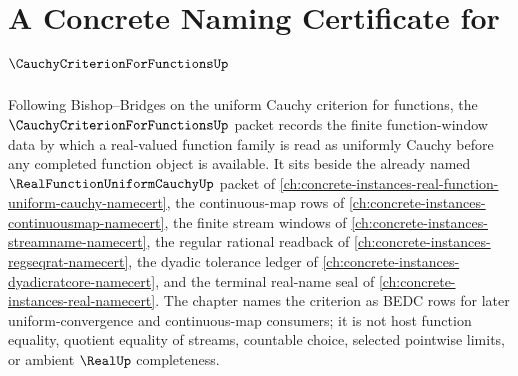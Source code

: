 \chapter{A Concrete Naming Certificate for $\CauchyCriterionForFunctionsUp$}
\label{ch:concrete-instances-cauchy-criterion-for-functions-namecert}

Following Bishop--Bridges on the uniform Cauchy criterion for functions, the $\CauchyCriterionForFunctionsUp$ packet records the finite function-window data by which a real-valued function family is read as uniformly Cauchy before any completed function object is available. It sits beside the already named $\RealFunctionUniformCauchyUp$ packet of \autoref{ch:concrete-instances-real-function-uniform-cauchy-namecert}, the continuous-map rows of \autoref{ch:concrete-instances-continuousmap-namecert}, the finite stream windows of \autoref{ch:concrete-instances-streamname-namecert}, the regular rational readback of \autoref{ch:concrete-instances-regseqrat-namecert}, the dyadic tolerance ledger of \autoref{ch:concrete-instances-dyadicratcore-namecert}, and the terminal real-name seal of \autoref{ch:concrete-instances-real-namecert}. The chapter names the criterion as BEDC rows for later uniform-convergence and continuous-map consumers; it is not host function equality, quotient equality of streams, countable choice, selected pointwise limits, or ambient $\RealUp$ completeness.

